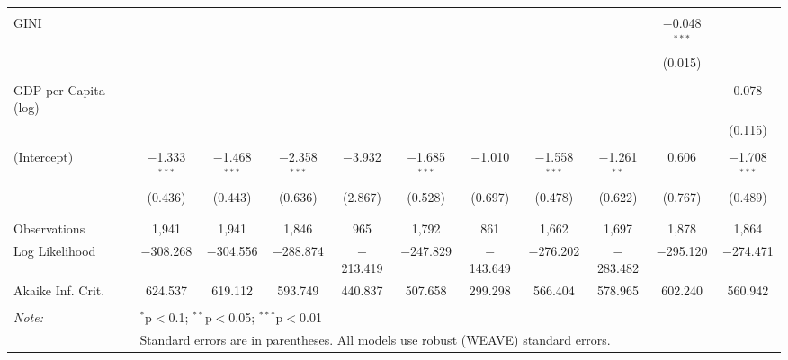 \documentclass[a4paper]{article}\usepackage[]{graphicx}\usepackage[]{color}
\begin{document}
\begin{table}
\begin{center}
{{\begin{tabular}{@{\extracolsep{5pt}}lcccccccccc}
  & & & & & & & & & & \\ 
 GINI &  &  &  &  &  &  &  &  & $-$0.048$^{***}$ &  \\ 
  &  &  &  &  &  &  &  &  & (0.015) &  \\ 
  & & & & & & & & & & \\ 
 GDP per Capita (log) &  &  &  &  &  &  &  &  &  & 0.078 \\ 
  &  &  &  &  &  &  &  &  &  & (0.115) \\ 
  & & & & & & & & & & \\ 
 (Intercept) & $-$1.333$^{***}$ & $-$1.468$^{***}$ & $-$2.358$^{***}$ & $-$3.932 & $-$1.685$^{***}$ & $-$1.010 & $-$1.558$^{***}$ & $-$1.261$^{**}$ & 0.606 & $-$1.708$^{***}$ \\ 
  & (0.436) & (0.443) & (0.636) & (2.867) & (0.528) & (0.697) & (0.478) & (0.622) & (0.767) & (0.489) \\ 
  & & & & & & & & & & \\ 
\hline \\[-1.8ex] 
Observations & 1,941 & 1,941 & 1,846 & 965 & 1,792 & 861 & 1,662 & 1,697 & 1,878 & 1,864 \\ 
Log Likelihood & $-$308.268 & $-$304.556 & $-$288.874 & $-$213.419 & $-$247.829 & $-$143.649 & $-$276.202 & $-$283.482 & $-$295.120 & $-$274.471 \\ 
Akaike Inf. Crit. & 624.537 & 619.112 & 593.749 & 440.837 & 507.658 & 299.298 & 566.404 & 578.965 & 602.240 & 560.942 \\ 
\hline 
\hline \\[-1.8ex] 
\textit{Note:}  & \multicolumn{10}{l}{$^{*}$p$<$0.1; $^{**}$p$<$0.05; $^{***}$p$<$0.01} \\ 
 & \multicolumn{10}{l}{Standard errors are in parentheses. All models use robust (WEAVE) standard errors.} \\ 
\end{tabular} 

}}
\end{center}

\end{table}
\end{document}
